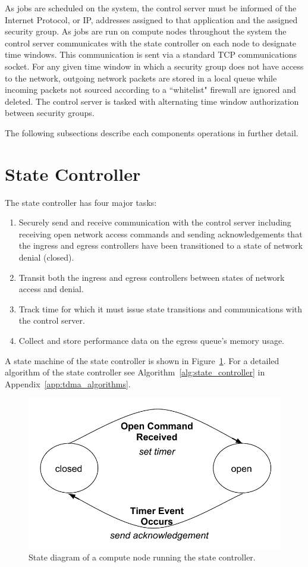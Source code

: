\documentclass[oneside,12pt]{memoir}
\begin{document}
As jobs are scheduled on the system, the control server must be informed of the Internet Protocol, or IP, addresses assigned to that application and the assigned security group. As jobs are run on compute nodes throughout the system the control server communicates with the state controller on each node to designate time windows. This communication is sent via a standard TCP communications socket. For any given time window in which a security group does not have access to the network, outgoing network packets are stored in a local queue while incoming packets not sourced according to a ``whitelist" firewall are ignored and deleted. The control server is tasked with alternating time window authorization between security groups.

The following subsections describe each components operations in further detail. 
\section{State Controller}
The state controller has four major tasks:
\begin{enumerate} \itemsep1pt \parskip0pt 
\item Securely send and receive communication with the control server including receiving open network access commands and sending acknowledgements that the ingress and egress controllers have been transitioned to a state of network denial (closed).
\item Transit both the ingress and egress controllers between states of network access and denial.
\item Track time for which it must issue state transitions and communications with the control server.
\item Collect and store performance data on the egress queue's memory usage.
\end{enumerate}

A state machine of the state controller is shown in Figure~\ref{fig:node_state_diagram}. For a detailed algorithm of the state controller see Algorithm~\ref{alg:state_controller} in Appendix~\ref{app:tdma_algorithms}.

\begin{figure}
\centering
\includegraphics[scale=0.7]{node_state_diagram.pdf}
\caption{State diagram of a compute node running the state controller.}
\label{fig:node_state_diagram}
\end{figure}
\end{document}
